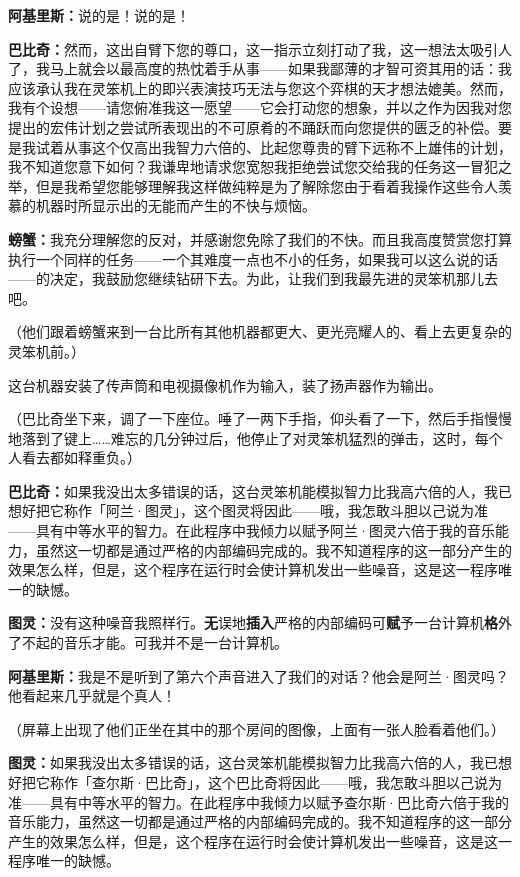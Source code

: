 \documentclass[
  12pt,
  twoside,
  openright,
  oldfontcommands,
]{memoir}
\newcommand{\heititext}[1]{{\heifamily\bfseries #1}}
\newcommand{\dialogname}[1]{{\heifamily\bfseries #1}}
\begin{document}
\dialogname{阿基里斯：}说的是！说的是！

\dialogname{巴比奇：}然而，这出自臂下您的尊口，这一指示立刻打动了我，这一想法太吸引人了，我马上就会以最高度的热忱着手从事------如果我鄙薄的才智可资其用的话：我应该承认我在灵笨机上的即兴表演技巧无法与您这个弈棋的天才想法媲美。然而，我有个设想------请您俯准我这一愿望------它会打动您的想象，并以之作为因我对您提出的宏伟计划之尝试所表现出的不可原肴的不踊跃而向您提供的匮乏的补偿。要是我试着从事这个仅高出我智力六倍的、比起您尊贵的臂下远称不上雄伟的计划，我不知道您意下如何？我谦卑地请求您宽恕我拒绝尝试您交给我的任务这一冒犯之举，但是我希望您能够理解我这样做纯粹是为了解除您由于看着我操作这些令人羡慕的机器时所显示出的无能而产生的不快与烦恼。

\dialogname{螃蟹：}我充分理解您的反对，并感谢您免除了我们的不快。而且我高度赞赏您打算执行一个同样的任务------一个其难度一点也不小的任务，如果我可以这么说的话------的决定，我鼓励您继续钻研下去。为此，让我们到我最先进的灵笨机那儿去吧。

（他们跟着螃蟹来到一台比所有其他机器都更大、更光亮耀人的、看上去更复杂的灵笨机前。）

这台机器安装了传声筒和电视摄像机作为输入，装了扬声器作为输出。

（巴比奇坐下来，调了一下座位。唾了一两下手指，仰头看了一下，然后手指慢慢地落到了键上\ldots\ldots 难忘的几分钟过后，他停止了对灵笨机猛烈的弹击，这时，每个人看去都如释重负。）

\dialogname{巴比奇：}如果我没出太多错误的话，这台灵笨机能模拟智力比我高六倍的人，我已想好把它称作「阿兰·图灵」，这个图灵将因此------哦，我怎敢斗胆以己说为准------具有中等水平的智力。在此程序中我倾力以赋予阿兰·图灵六倍于我的音乐能力，虽然这一切都是通过严格的内部编码完成的。我不知道程序的这一部分产生的效果怎么样，但是，这个程序在运行时会使计算机发出一些噪音，这是这一程序唯一的缺憾。

\dialogname{图灵：}没有这种噪音我照样行。\heititext{无}误地\heititext{插入}严格的内部编码可\heititext{赋}予一台计算机\heititext{格}外了不起的音乐才能。可我并不是一台计算机。

\dialogname{阿基里斯：}我是不是听到了第六个声音进入了我们的对话？他会是阿兰·图灵吗？他看起来几乎就是个真人！

（屏幕上出现了他们正坐在其中的那个房间的图像，上面有一张人脸看着他们。）

\dialogname{图灵：}如果我没出太多错误的话，这台灵笨机能模拟智力比我高六倍的人，我已想好把它称作「查尔斯·巴比奇」，这个巴比奇将因此------哦，我怎敢斗胆以己说为准------具有中等水平的智力。在此程序中我倾力以赋予查尔斯·巴比奇六倍于我的音乐能力，虽然这一切都是通过严格的内部编码完成的。我不知道程序的这一部分产生的效果怎么样，但是，这个程序在运行时会使计算机发出一些噪音，这是这一程序唯一的缺憾。
\end{document}
